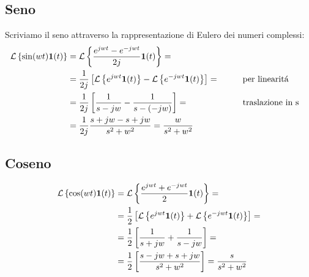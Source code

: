\documentclass[../main.tex]{subfiles}
\begin{document}
	\subsection{Seno}
		\label{sec:trasf_seno}
		Scriviamo il seno attraverso la rappresentazione di Eulero dei numeri complessi:
		\begin{align*}
			\mathcal{L} \left\lbrace \sin(wt) \textbf{1}(t) \right\rbrace &= \mathcal{L} \left\lbrace \frac{e^{jwt} - e^{-jwt}}{2j} \textbf{1}(t) \right\rbrace =
			\\
			&= \frac{1}{2j} \left[ \mathcal{L} \left\lbrace e^{jwt} \textbf{1}(t) \right\rbrace - \mathcal{L} \left\lbrace e^{-jwt} \textbf{1}(t) \right\rbrace \right]= \qquad &&\text{per linearit\'{a}}
			\\
			&= \frac{1}{2j} \left[ \frac{1}{s-jw} - \frac{1}{s-(-jw)} \right] = \qquad &&\text{traslazione in s}
			\\
			&= \frac{1}{2j} \frac{s+jw-s+jw}{s^2+w^2} = \frac{w}{s^2+w^2}
		\end{align*}

	\subsection{Coseno}
		\label{sec:trasf_coseno}
		\begin{align*}
			\mathcal{L} \left\lbrace \cos(wt) \textbf{1}(t) \right\rbrace &= \mathcal{L} \left\lbrace \frac{e^{jwt} + e^{-jwt}}{2} \textbf{1}(t) \right\rbrace =
			\\
			&= \frac{1}{2} \left[ \mathcal{L} \left\lbrace e^{jwt} \textbf{1}(t) \right\rbrace + \mathcal{L} \left\lbrace e^{-jwt} \textbf{1}(t) \right\rbrace \right] =
			\\
			&= \frac{1}{2} \left[ \frac{1}{s+jw} + \frac{1}{s-jw} \right] =
			\\
			&= \frac{1}{2} \left[ \frac{s-jw+s+jw}{s^2+w^2} \right] = \frac{s}{s^2+w^2}
			\\
		\end{align*}
\end{document}
